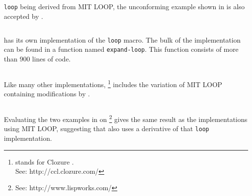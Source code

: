 \sbcl{} \texttt{loop} being derived from MIT LOOP, the unconforming
example shown in  is also accepted by \sbcl{}.

\subsection{\clisp{}}

\clisp{} has its own implementation of the \texttt{loop} macro.  The
bulk of the implementation can be found in a function named
\texttt{expand-loop}.  This function consists of more than $900$ lines
of code.

\subsection{\ccl{}}

Like many other implementations, \ccl{}%
\footnote{\ccl{} stands for Clozure \commonlisp.\\
See: http://ccl.clozure.com/}
includes the variation of MIT
LOOP containing modifications by \symbolics{}.

\subsection{\lispworks}

Evaluating the two examples in  on \lispworks{}%
\footnote{See: http://www.lispworks.com/}
gives the same result as the implementations using MIT LOOP,
suggesting that \lispworks{} also uses a derivative of that
\texttt{loop} implementation.
